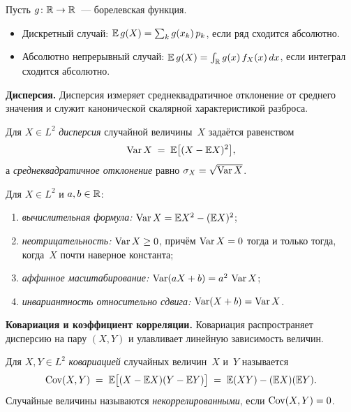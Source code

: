\begin{proposition}
\label{prop:lotus}
Пусть $g \colon \mathbb{R} \to \mathbb{R}$~--- борелевская функция.
\begin{itemize}
  \item Дискретный случай: $\mathbb{E}\, g(X) = \sum_k g(x_k)\, p_k$, если ряд сходится абсолютно.
  \item Абсолютно непрерывный случай: $\mathbb{E}\, g(X) = \int_{\mathbb{R}} g(x)\, f_X(x)\, dx$, если интеграл сходится абсолютно.
\end{itemize}
\end{proposition}

\medskip
\noindent\textbf{Дисперсия.} Дисперсия измеряет среднеквадратичное отклонение от среднего значения и служит канонической скалярной характеристикой разброса.

\begin{definition}
\label{def:variance}
Для $X \in L^2$ \emph{дисперсия} случайной величины~$X$ задаётся равенством
\[
  \operatorname{Var} X \;=\; \mathbb{E}\bigl[(X - \mathbb{E} X)^2\bigr],
\]
а \emph{среднеквадратичное отклонение} равно $\sigma_X = \sqrt{\operatorname{Var} X}$.
\end{definition}

\begin{proposition}
\label{prop:var-properties}
Для $X \in L^2$ и $a, b \in \mathbb{R}$:
\begin{enumerate}[label=(\alph*)]
  \item \emph{вычислительная формула:} $\operatorname{Var} X = \mathbb{E} X^2 - (\mathbb{E} X)^2$;
  \item \emph{неотрицательность:} $\operatorname{Var} X \geq 0$, причём $\operatorname{Var} X = 0$ тогда и только тогда, когда~$X$ почти наверное константа;
  \item \emph{аффинное масштабирование:} $\operatorname{Var}(aX + b) = a^2\, \operatorname{Var} X$;
  \item \emph{инвариантность относительно сдвига:} $\operatorname{Var}(X + b) = \operatorname{Var} X$.
\end{enumerate}
\end{proposition}

\medskip
\noindent\textbf{Ковариация и коэффициент корреляции.} Ковариация распространяет дисперсию на пару $(X, Y)$ и улавливает линейную зависимость величин.

\begin{definition}[Ковариация]
\label{def:covariance}
Для $X, Y \in L^2$ \emph{ковариацией} случайных величин~$X$ и~$Y$ называется
\[
  \operatorname{Cov}(X, Y) \;=\; \mathbb{E}\bigl[(X - \mathbb{E} X)(Y - \mathbb{E} Y)\bigr] \;=\; \mathbb{E}(XY) - (\mathbb{E} X)(\mathbb{E} Y).
\]
Случайные величины называются \emph{некоррелированными}, если $\operatorname{Cov}(X, Y) = 0$.
\end{definition}


